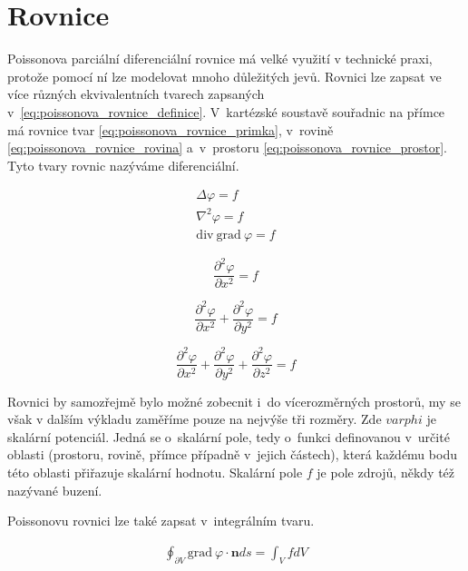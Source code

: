 \documentclass{book}
\newcommand{\vect}[1]{\boldsymbol{#1}}
\newcommand{\grad}{\mathrm{grad}}
\newcommand{\diverg}{\mathrm{div}}
\begin{document}
\section{Rovnice}

Poissonova parciální diferenciální rovnice má velké využití v technické praxi, protože pomocí ní lze modelovat mnoho důležitých jevů.
Rovnici lze zapsat ve více různých ekvivalentních tvarech zapsaných v~\eqref{eq:poissonova_rovnice_definice}. V~kartézské soustavě souřadnic na přímce má rovnice tvar \eqref{eq:poissonova_rovnice_primka}, v~rovině
\eqref{eq:poissonova_rovnice_rovina} a~v~prostoru \eqref{eq:poissonova_rovnice_prostor}. Tyto tvary rovnic nazýváme diferenciální.

\begin{equation}
\label{eq:poissonova_rovnice_definice}
\begin{split}
\Delta \varphi = f \\
\nabla^2 \varphi = f \\
\diverg \ \grad \ \varphi = f
\end{split}
\end{equation}

\begin{equation}
\label{eq:poissonova_rovnice_primka}
\frac{\partial^2 \varphi}{\partial x^2} = f
\end{equation}

\begin{equation}
\label{eq:poissonova_rovnice_rovina}
\frac{\partial^2 \varphi}{\partial x^2} + \frac{\partial^2 \varphi}{\partial y^2} = f
\end{equation}

\begin{equation}
\label{eq:poissonova_rovnice_prostor}
\frac{\partial^2 \varphi}{\partial x^2} + \frac{\partial^2 \varphi}{\partial y^2} + \frac{\partial^2 \varphi}{\partial z^2} = f
\end{equation}

Rovnici by samozřejmě bylo možné zobecnit i~do vícerozměrných prostorů, my se však v dalším výkladu zaměříme pouze na nejvýše tři rozměry.
Zde \(varphi\) je skalární potenciál. Jedná se o~skalární pole, tedy o~funkci definovanou v~určité oblasti (prostoru, rovině, přímce případně v~jejich částech), která každému bodu této oblasti přiřazuje skalární
hodnotu. Skalární pole \(f\) je pole zdrojů, někdy též nazývané buzení.

Poissonovu rovnici lze také zapsat v~integrálním tvaru.

\begin{equation}
\label{eq:poissonova_rovnice_integralni_tvar}
\begin{split}
\oint_{\partial V} \grad \ \varphi \cdot \vect{n} ds = \int_V f dV
\end{split}
\end{equation}
\end{document}

